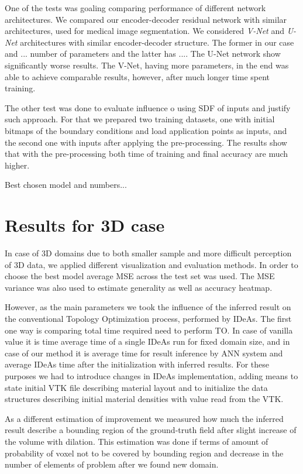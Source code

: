 One of the tests was goaling comparing performance of different network architectures.
We compared our encoder-decoder residual network with similar architectures, used for medical image segmentation.
We considered \emph{V-Net}\cite{} and \emph{U-Net}\cite{} architectures with similar encoder-decoder structure.
The former in our case and $...$ number of parameters and the latter has $...$.
The U-Net network show significantly worse results.
The V-Net, having more parameters, in the end was able to achieve comparable results, however, after much longer time spent training.
\medskip

The other test was done to evaluate influence o using SDF of inputs and justify such approach.
For that we prepared two training datasets, one with initial bitmaps of the boundary conditions and load application points as inputs, and the second one with inputs after applying the pre-processing.
The results show that with the pre-processing both time of training and final accuracy are much higher.
\medskip

Best chosen model and numbers...

\section{Results for 3D case}

In case of 3D domains due to both smaller sample and more difficult perception of 3D data, we applied different visualization and evaluation methods.
In order to choose the best model average MSE across the test set was used.
The MSE variance was also used to estimate generality as well as accuracy heatmap.

However, as the main parameters we took the influence of the inferred result on the conventional Topology Optimization process, performed by IDeAs.
The first one way is comparing total time required need to perform TO. 
In case of vanilla value it is time average time of a single IDeAs run for fixed domain size, and in case of our method it is average time for result inference by ANN system and average IDeAs time after the initialization with inferred results. For these purposes we had to introduce changes in IDeAs implementation, adding means to state initial VTK file describing material layout and to initialize the data structures describing initial material densities with value read from the VTK.

As a different estimation of improvement we measured how much the inferred result describe a bounding region of the ground-truth field after slight increase of the volume with dilation.
This estimation was done if terms of amount of probability of voxel not to be covered by bounding region and decrease in the number of elements of problem  after we found new domain. 

